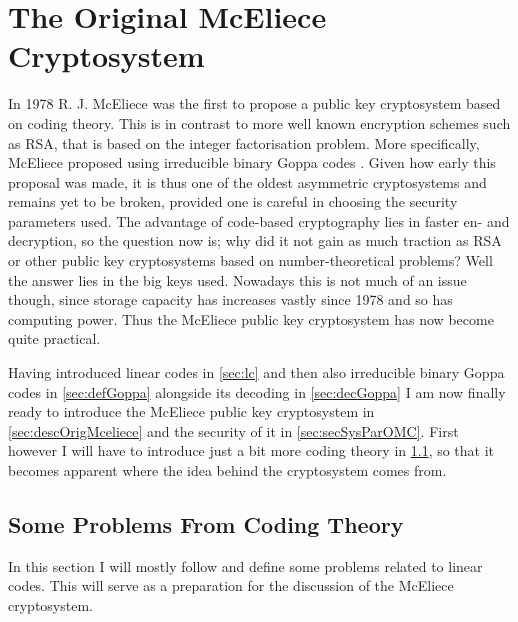 
\chapter{The Original McEliece Cryptosystem}
\label{chap:origmceliece}

In 1978 R. J. McEliece was the first to propose a public key cryptosystem based on coding theory. This is in contrast to more well known encryption schemes such as RSA, that is based on the integer factorisation problem. More specifically, McEliece proposed using irreducible binary Goppa codes \cite{mceliece}. Given how early this proposal was made, it is thus one of the oldest asymmetric cryptosystems and remains yet to be broken, provided one is careful in choosing the security parameters used. The advantage of code-based cryptography lies in faster en- and decryption, so the question now is; why did it not gain as much traction as RSA or other public key cryptosystems based on number-theoretical problems? Well the answer lies in the big keys used. Nowadays this is not much of an issue though, since storage capacity has increases vastly since 1978 and so has computing power. Thus the McEliece public key cryptosystem has now become quite practical.

Having introduced linear codes in \cref{sec:lc} and then also irreducible binary Goppa codes in \cref{sec:defGoppa} alongside its decoding in \cref{sec:decGoppa} I am now finally ready to introduce the McEliece public key cryptosystem in \cref{sec:descOrigMceliece} and the security of it in \cref{sec:secSysParOMC}. First however I will have to introduce just a bit more coding theory in \cref{sec:codTheProbs}, so that it becomes apparent where the idea behind the cryptosystem comes from.



\section{Some Problems From Coding Theory}
\label{sec:codTheProbs}

In this section I will mostly follow \cite{EOS} and define some problems related to linear codes. This will serve as a preparation for the discussion of the McEliece cryptosystem.

